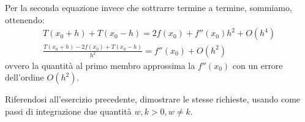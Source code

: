 Per la seconda equazione invece che sottrarre termine a termine, sommiamo,
ottenendo:
\begin{equation*}
	\begin{split}
		T(x_{0}+h) + T(x_{0}-h) = 2f(x_{0}) + f''(x_{0})h^{2} + O(h^{4})\\
		\frac{T(x_{0}+h) - 2f(x_{0}) + T(x_{0}-h)}{h^{2}} = f''(x_{0}) + O(h^{2}) 
	\end{split}
\end{equation*}
ovvero la quantit\`a al primo membro approssima la $f''(x_{0})$ con un errore 
dell'ordine $O(h^{2})$.
\begin{exercise}
	Riferendosi all'esercizio precedente, dimostrare le stesse richieste, usando 
	come passi di integrazione due quantit\`a $w, k > 0, w \not = k$.
\end{exercise}
